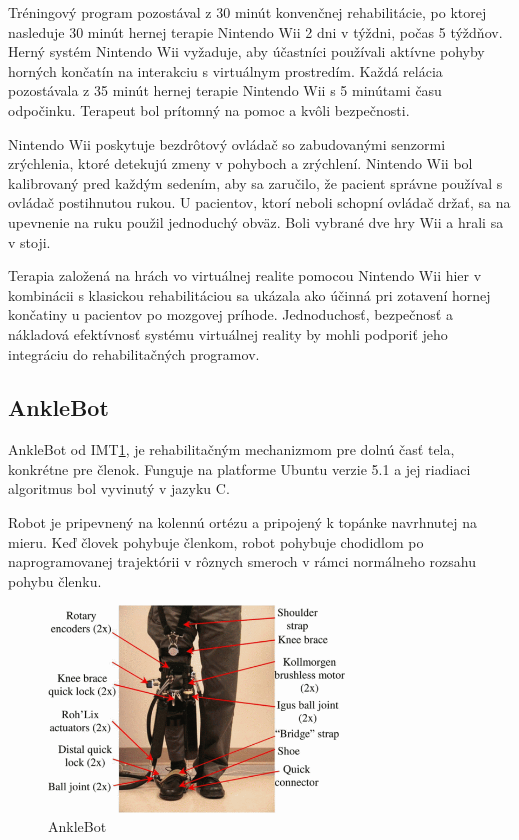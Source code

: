 \documentclass[10pt,twoside,slovak,a4paper]{article}
\begin{document}
Tréningový program pozostával z 30 minút konvenčnej rehabilitácie, po ktorej nasleduje 30 minút hernej terapie Nintendo Wii 2 dni v týždni, počas 5 týždňov. Herný systém Nintendo Wii vyžaduje, aby účastníci používali aktívne pohyby horných končatín na interakciu s virtuálnym prostredím. Každá relácia pozostávala z 35 minút hernej terapie Nintendo Wii s 5 minútami času odpočinku. Terapeut bol prítomný na pomoc a kvôli bezpečnosti.

Nintendo Wii poskytuje bezdrôtový ovládač so zabudovanými senzormi zrýchlenia, ktoré detekujú zmeny v pohyboch a zrýchlení. Nintendo Wii bol kalibrovaný pred každým sedením, aby sa zaručilo, že pacient správne používal  s ovládač postihnutou rukou. U pacientov, ktorí neboli schopní ovládač držať, sa na upevnenie na ruku použil jednoduchý obväz. Boli vybrané dve hry Wii a hrali sa v stoji. 

Terapia založená na hrách vo virtuálnej realite pomocou Nintendo Wii hier v kombinácii s klasickou rehabilitáciou sa ukázala ako účinná pri zotavení hornej končatiny u pacientov po mozgovej príhode. Jednoduchosť, bezpečnosť a nákladová efektívnosť systému virtuálnej reality by mohli podporiť jeho integráciu do rehabilitačných programov.

\subsection{AnkleBot}\cite{7523762}
AnkleBot od IMT\ref{fig:anklebot}, je rehabilitačným mechanizmom pre dolnú časť tela, konkrétne pre členok. Funguje na platforme Ubuntu verzie 5.1 a jej riadiaci algoritmus bol vyvinutý v jazyku C. 

Robot je pripevnený na kolennú ortézu a pripojený k topánke navrhnutej na mieru. Keď človek pohybuje členkom, robot pohybuje chodidlom po naprogramovanej trajektórii v rôznych smeroch v rámci normálneho rozsahu pohybu členku.

\begin{figure}
    \centering
    \includegraphics[width = 0.7\textwidth]{obrazky/AnkleBot.png}
    \caption{AnkleBot}
    \label{fig:anklebot}
\end{figure}
\end{document}
